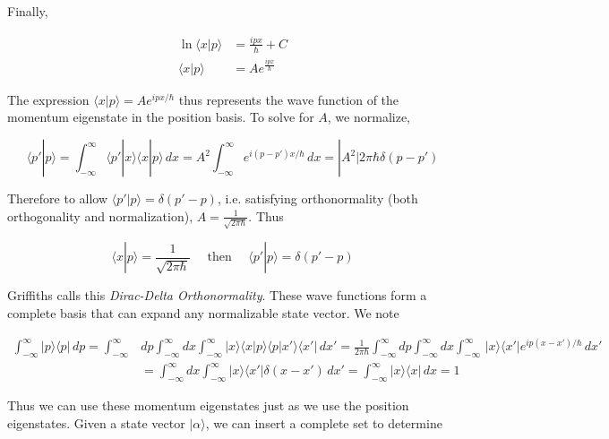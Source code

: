 Finally, 

\begin{align} \label{}
  \ln \langle x|p \rangle &= \frac{ipx}{\hbar} + C \\ 
  \langle x|p \rangle &= Ae^{\frac{ipx}{\hbar}}
\end{align}\vspace{3px}


The expression $\langle x|p \rangle = Ae^{ipx / \hbar}$ thus represents the
wave function of the momentum eigenstate in the position basis. To solve for $A$,
we normalize, 

\[
\langle p'|p \rangle = \int_{-\infty}^{\infty} \langle p'|x \rangle \langle x|p
\rangle \, dx = A^2 \int_{-\infty}^{\infty} e^{i(p-p')x / \hbar} \, dx
= |A^2|2\pi\hbar \delta(p-p')
\] \vspace{3px}

Therefore to allow $\langle p' | p \rangle = \delta (p' - p)$, i.e. satisfying
orthonormality (both orthogonality and normalization), $A
= \frac{1}{\sqrt{2\pi\hbar}}$. Thus 

\begin{subbox}{}
  \[
  \langle x|p \rangle = \frac{1}{\sqrt{2\pi\hbar}} \quad \text{ then } \quad
  \langle p' | p \rangle = \delta(p' - p)
  \] 
\end{subbox}

Griffiths calls this \textit{Dirac-Delta Orthonormality}. These wave functions
form a complete basis that can expand any normalizable state vector. We note  

\begin{align} \label{}
  \int_{-\infty}^{\infty} | p \rangle \langle p | \, dp
  = \int_{-\infty}^{\infty} &dp \int_{-\infty}^{\infty}  dx
  \int_{-\infty}^{\infty} |x\rangle \langle x|p\rangle \langle p | x'\rangle
  \langle x'| \, dx ' = \frac{1}{2\pi\hbar} \int_{-\infty}^{\infty} dp
  \int_{-\infty}^{\infty} dx \int_{-\infty}^{\infty} \,|x\rangle
  \langle x'| e^{ip(x - x') / \hbar}\, dx' \\ 
                               &= \int_{-\infty}^{\infty} dx
                               \int_{-\infty}^{\infty} |x\rangle \langle
                               x'| \delta(x-x') \, dx' = \int_{-\infty}^{\infty}
                               |x\rangle \langle x| \, dx = 1
\end{align}\vspace{3px}

Thus we can use these momentum eigenstates just as we use the position
eigenstates. Given a state vector $|\alpha\rangle$, we can insert a complete
set to determine 

